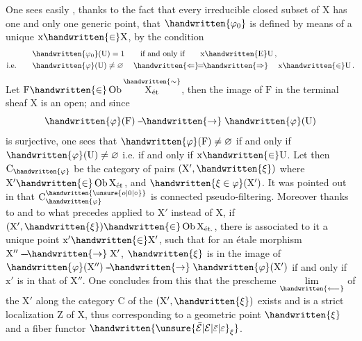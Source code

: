 \begin{lrbox}{\coteFourTypescript}
\begin{minipage}[t]{.96\linewidth}
One sees easily , thanks to the fact that every irreducible closed subset of $\mathrm X$ has one and only one generic point, that $\handwritten{\varphi_{0}}$ is defined by means of a  unique $\mathrm x\handwritten{\in}\mathrm X$, by the condition
\[
\begin{aligned}
&\handwritten{\varphi_{0}}(\mathrm U)=1\qquad\text{if and only if}\qquad \mathrm x\handwritten{\mathrm E}\mathrm U\,,\\
\text{i.e.}\qquad &\handwritten{\varphi}(\mathrm U)\ne\varnothing\quad \mathrel{\handwritten{\Leftarrow}\mkern-7mu=\mkern-7mu\handwritten{\Rightarrow}}\quad \mathrm x\handwritten{\in}\mathrm U\,.
\end{aligned}
\]
Let $\mathrm F\handwritten{\in}\operatorname{Ob}\overset{\handwritten{\sim}}{\mathrm X_{\text{ét}}}$, then the image of $\mathrm F$ in the terminal sheaf $\mathrm X$ is an open; and since
\[
\handwritten{\varphi}(\mathrm F)\mathrel{\mbox{-}\mkern-2mu\mbox{-}\mkern-3mu\handwritten{\to}}\handwritten{\varphi}(\mathrm U)
\]
is surjective, one sees that $\handwritten{\varphi}(\mathrm F)\ne\varnothing$ if and only if $\handwritten{\varphi}(\mathrm U)\ne\varnothing$ i.e. if and only if $\mathrm x\handwritten{\in}\mathrm U$. Let then $\mathrm C_{\handwritten{\varphi}}$ be the category of pairs $(\mathrm X',\handwritten{\xi})$ where $\mathrm X'\handwritten{\in}\operatorname{Ob}\mathrm X_{\text{ét}}$, and $\handwritten{\xi\in\varphi}(\mathrm X')$. It was pointed out in  that $\mathrm C_{\handwritten{\varphi}}^{\handwritten{\unsure{o|0|\circ}}}$ is connected pseudo-filtering. Moreover thanks to  and to what precedes applied to $\mathrm X'$ instead of $\mathrm X$, if $(\mathrm X',\handwritten{\xi})\handwritten{\in}\operatorname{Ob}\mathrm X_{\text{ét.}}$, there is\unsure{:} associated to it a unique point $\mathrm x'\handwritten{\in}\mathrm X'$, such that for an étale morphism $\mathrm X''\mathrel{\mbox{-}\mkern-2mu\mbox{-}\mkern-2mu\mbox{-}\mkern-3mu\handwritten{\to}}\mathrm X'$, $\handwritten{\xi}$ is in the image of $\handwritten{\varphi}(\mathrm X'')\mathrel{\mbox{-}\mkern-2mu\mbox{-}\mkern-3mu\handwritten{\to}}\handwritten{\varphi}(\mathrm X')$ if and only if $\mathrm x'$ is in that of $\mathrm X''$. One concludes from this that the prescheme $\underset{\handwritten{\longleftarrow}}{\lim}$ of the $\mathrm X'$ along the category $\mathrm C$ of the $(\mathrm X',\handwritten{\xi})$ exists and is a strict localization $\mathrm Z$ of $\mathrm X$, thus corresponding to a geometric point $\handwritten{\xi}$ and a fiber functor $\handwritten{{\unsure{\bar{\mathcal E}|\mathcal E|\bar{\varepsilon}|\varepsilon}}_{\xi}}$.
\end{minipage}
\end{lrbox}
